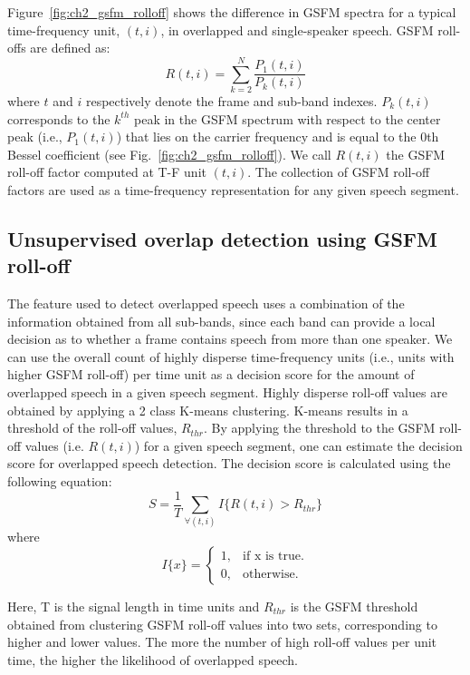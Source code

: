 {Figure~\ref{fig:ch2_gsfm_rolloff} shows the difference in GSFM spectra for a typical time-frequency unit, $(t,i)$, in overlapped and single-speaker speech. 
GSFM roll-offs are defined as: 
\begin{equation}
\label{eq:gsfm_rolloff}
R(t,i) = \sum\limits_{k=2}^{N} \frac{P_1(t,i)}{P_k(t,i)}
\end{equation}
where $t$ and $i$ respectively denote the frame and sub-band indexes. 
$P_k(t, i)$ corresponds to the $k^{th}$ peak in the GSFM spectrum with respect to the center peak (i.e., $P_1(t,i)$) that lies on the carrier frequency and is equal to the 0th Bessel coefficient (see Fig.~\ref{fig:ch2_gsfm_rolloff}). 
We call $R(t, i)$ the GSFM roll-off factor computed at T-F unit $(t, i)$. 
The collection of GSFM roll-off factors are used as a time-frequency representation for any given speech segment. 


\subsection{Unsupervised overlap detection using GSFM roll-off}
\label{sssec:unsupervised_ovl_det_gsfm}
The feature used to detect overlapped speech uses a combination of the information obtained from all sub-bands, since each band can provide a local decision as to whether a frame contains speech from more than one speaker. 
We can use the overall count of highly disperse time-frequency units (i.e., units with higher GSFM roll-off) per time unit as a decision score for the amount of overlapped speech in a given speech segment. 
Highly disperse roll-off values are obtained by applying a 2 class K-means clustering. 
K-means results in a threshold of the roll-off values, $R_{thr}$. 
By applying the threshold to the GSFM roll-off values (i.e. $R(t, i)$) for a given speech segment, one can estimate the decision score for overlapped speech detection. 
The decision score is calculated using the following equation:
\begin{equation}
\label{eq:gsfm_features}
S = \frac{1}{T}\sum\limits_{\forall (t,i)} I\{R(t,i) > R_{thr}\}
\end{equation}
where
\begin{equation}
I\{x\}=\begin{cases}
1, & \text{if x is true}.\\
0, & \text{otherwise}.
\end{cases}
\end{equation}

Here, T is the signal length in time units and $R_{thr}$ is the GSFM threshold obtained from clustering GSFM roll-off values into two sets, corresponding to higher and lower values. 
The more the number of high roll-off values per unit time, the higher the likelihood of overlapped speech. 

}
